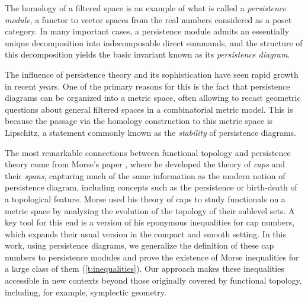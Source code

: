 The homology of a filtered space is an example of what is called a \emph{persistence module}, a functor to vector spaces from the real numbers considered as a poset category.
In many important cases, a persistence module admits an essentially unique decomposition into indecomposable direct summands, and the structure of this decomposition yields the basic invariant known as its \emph{persistence diagram}.

The influence of persistence theory and its sophistication have seen rapid growth in recent years.
One of the primary reasons for this is the fact that persistence diagrams can be organized into a metric space, often allowing to recast geometric questions about general filtered spaces in a combinatorial metric model.
This is because the passage via the homology construction to this metric space is Lipschitz, a statement commonly known as the \emph{stability} of persistence diagrams.

The most remarkable connections between functional topology and persistence theory come from Morse's paper \cite{Morse.1940}, where he developed the theory of \emph{caps} and their \emph{spans}, capturing much of the same information as the modern notion of persistence diagram, including concepts such as the persistence or birth-death of a topological feature.
Morse used his theory of caps to study functionals on a metric space by analyzing the evolution of the topology of their sublevel sets.
A key tool for this end is a version of his eponymous inequalities for cap numbers, which expands their usual version in the compact and smooth setting.
In this work, using persistence diagrams, we generalize the definition of these cap numbers to persistence modules and prove the existence of Morse inequalities for a large class of them (\cref{t:inequalities}).
Our approach makes these inequalities accessible in new contexts beyond those originally covered by functional topology, including, for example, symplectic geometry.

